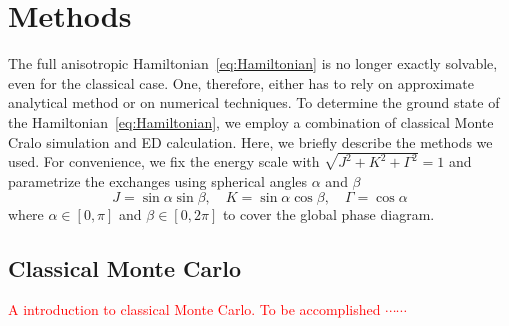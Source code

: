 \documentclass[aps,prb,reprint,amsfonts,amsmath,amssymb,showpacs,groupedaddress,superscriptaddress]{revtex4-1}
\begin{document}
\section{\label{sec:SectionII}Methods}
The full anisotropic Hamiltonian~\eqref{eq:Hamiltonian} is no longer exactly solvable, even for the classical case. One, therefore, either has to rely on approximate analytical method or on numerical techniques. To determine the ground state of the Hamiltonian~\eqref{eq:Hamiltonian}, we employ a combination of classical Monte Cralo simulation and ED calculation. Here, we briefly describe the methods we used. For convenience, we fix the energy scale with $\sqrt{J^2 + K^2 + \Gamma^2}=1$ and parametrize the exchanges using spherical angles $\alpha$ and $\beta$
\begin{equation}
    J = \sin\alpha \sin\beta, \quad
    K = \sin\alpha \cos\beta, \quad
    \Gamma = \cos\alpha \label{eq:Parameters}
\end{equation}
where $\alpha \in [0, \pi]$ and $\beta \in [0, 2\pi]$ to cover the global phase diagram.

\subsection{\label{sec:SectionIIA}Classical Monte Carlo}
\textcolor{red}{A introduction to classical Monte Carlo. To be accomplished $\cdots \cdots$}
\end{document}
